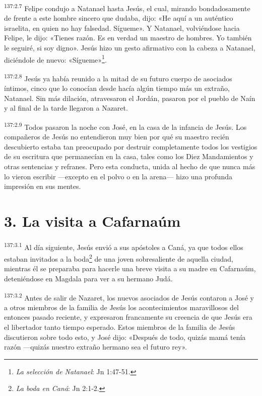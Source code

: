 \par
\textsuperscript{137:2.7} Felipe condujo a Natanael hasta Jesús, el cual, mirando bondadosamente de frente a este hombre sincero que dudaba, dijo: «He aquí a un auténtico israelita, en quien no hay falsedad. Sígueme». Y Natanael, volviéndose hacia Felipe, le dijo: «Tienes razón. Es en verdad un maestro de hombres. Yo también le seguiré, si soy digno». Jesús hizo un gesto afirmativo con la cabeza a Natanael, diciéndole de nuevo: «Sígueme»\footnote{\textit{La selección de Natanael}: Jn 1:47-51.}.

\par
\textsuperscript{137:2.8} Jesús ya había reunido a la mitad de su futuro cuerpo de asociados íntimos, cinco que lo conocían desde hacía algún tiempo más un extraño, Natanael. Sin más dilación, atravesaron el Jordán, pasaron por el pueblo de Naín y al final de la tarde llegaron a Nazaret.

\par
\textsuperscript{137:2.9} Todos pasaron la noche con José, en la casa de la infancia de Jesús. Los compañeros de Jesús no entendieron muy bien por qué su maestro recién descubierto estaba tan preocupado por destruir completamente todos los vestigios de su escritura que permanecían en la casa, tales como los Diez Mandamientos y otras sentencias y refranes. Pero esta conducta, unida al hecho de que nunca más lo vieron escribir ---excepto en el polvo o en la arena--- hizo una profunda impresión en sus mentes.

\section*{3. La visita a Cafarnaúm}
\par
\textsuperscript{137:3.1} Al día siguiente, Jesús envió a sus apóstoles a Caná, ya que todos ellos estaban invitados a la boda\footnote{\textit{La boda en Caná}: Jn 2:1-2.} de una joven sobresaliente de aquella ciudad, mientras él se preparaba para hacerle una breve visita a su madre en Cafarnaúm, deteniéndose en Magdala para ver a su hermano Judá.

\par
\textsuperscript{137:3.2} Antes de salir de Nazaret, los nuevos asociados de Jesús contaron a José y a otros miembros de la familia de Jesús los acontecimientos maravillosos del entonces pasado reciente, y expresaron francamente su creencia de que Jesús era el libertador tanto tiempo esperado. Estos miembros de la familia de Jesús discutieron sobre todo esto, y José dijo: «Después de todo, quizás mamá tenía razón ---quizás nuestro extraño hermano sea el futuro rey».

